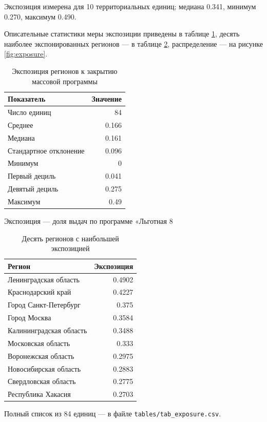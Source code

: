 \documentclass[
  russian,
  11pt,
]{article}
\begin{document}
Экспозиция измерена для 10 территориальных единиц; медиана 0.341,
минимум 0.270, максимум 0.490.

Описательные статистики меры экспозиции приведены в таблице
\ref{tab:summary}, десять наиболее экспонированных регионов --- в
таблице \ref{tab:exposure}, распределение --- на рисунке
\ref{fig:exposure}.

\begin{table}[htbp]
\centering
\small
\caption{Экспозиция регионов к закрытию массовой программы}
\label{tab:summary}
\begin{tabular}{lr}
\toprule
Показатель & Значение \\
\midrule
Число единиц & 84 \\
Среднее & 0.166 \\
Медиана & 0.161 \\
Стандартное отклонение & 0.096 \\
Минимум & 0 \\
Первый дециль & 0.041 \\
Девятый дециль & 0.275 \\
Максимум & 0.49 \\
\bottomrule
\end{tabular}
\par\smallskip\begin{minipage}{0.92\textwidth}\footnotesize
Экспозиция — доля выдач по программе «Льготная 8%
\end{minipage}
\end{table}

\begin{table}[htbp]
\centering
\small
\caption{Десять регионов с наибольшей экспозицией}
\label{tab:exposure}
\begin{tabular}{lr}
\toprule
Регион & Экспозиция \\
\midrule
Ленинградская область & 0.4902 \\
Краснодарский край & 0.4227 \\
Город Санкт-Петербург & 0.375 \\
Город Москва & 0.3584 \\
Калининградская область & 0.3488 \\
Московская область & 0.333 \\
Воронежская область & 0.2975 \\
Новосибирская область & 0.2883 \\
Свердловская область & 0.2775 \\
Республика Хакасия & 0.2703 \\
\bottomrule
\end{tabular}
\par\smallskip\begin{minipage}{0.92\textwidth}\footnotesize
Полный список из 84 единиц — в файле \texttt{tables/tab\_exposure.csv}. 
\end{minipage}
\end{table}
\end{document}
